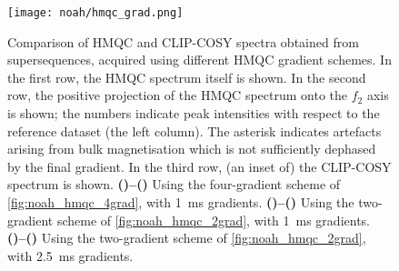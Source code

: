 \begin{figure}[!htbp]
    \centering
    \texttt{[image: noah/hmqc\_grad.png]}%
    {\label{fig:hmqc_grad_spec_4grad_1ms_hmqc}}%
    {\label{fig:hmqc_grad_spec_4grad_1ms_hmqcp}}%
    {\label{fig:hmqc_grad_spec_4grad_1ms_cosy}}%
    {\label{fig:hmqc_grad_spec_2grad_1ms_hmqc}}%
    {\label{fig:hmqc_grad_spec_2grad_1ms_hmqcp}}%
    {\label{fig:hmqc_grad_spec_2grad_1ms_cosy}}%
    {\label{fig:hmqc_grad_spec_2grad_2p5ms_hmqc}}%
    {\label{fig:hmqc_grad_spec_2grad_2p5ms_hmqcp}}%
    {\label{fig:hmqc_grad_spec_2grad_2p5ms_cosy}}%
    \caption[Comparison of  modules with different HMQC gradient schemes]{
        Comparison of HMQC and CLIP-COSY spectra obtained from  supersequences, acquired using different HMQC gradient schemes.
        In the first row, the HMQC spectrum itself is shown.
        In the second row, the positive projection of the HMQC spectrum onto the $f_2$ axis is shown; the numbers indicate peak intensities with respect to the reference dataset (the left column).
        The asterisk indicates artefacts arising from bulk magnetisation which is not sufficiently dephased by the final gradient.
        In the third row, (an inset of) the CLIP-COSY spectrum is shown.
        \textbf{()--()} Using the four-gradient scheme of \cref{fig:noah_hmqc_4grad}, with \qty{1}{ms} gradients.
        \textbf{()--()} Using the two-gradient scheme of \cref{fig:noah_hmqc_2grad}, with \qty{1}{ms} gradients.
        \textbf{()--()} Using the two-gradient scheme of \cref{fig:noah_hmqc_2grad}, with \qty{2.5}{ms} gradients.
    }
    \label{fig:hmqc_grad_spec}
\end{figure}


